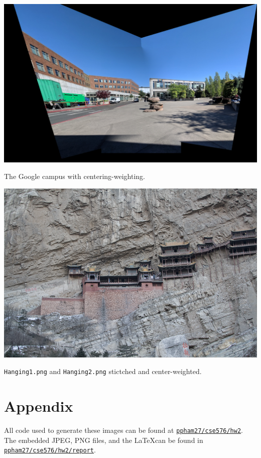 \documentclass[letterpaper]{article}
\begin{document}
\begin{center}
  \includegraphics[width=\textwidth]{google_stitched_center_weighted.png}
  
  The Google campus with centering-weighting.
\end{center}

\begin{center}
  \includegraphics[width=\textwidth]{hanging_center_weighted.png}
  
  \texttt{Hanging1.png} and \texttt{Hanging2.png} stictched and center-weighted.
\end{center}

\section*{Appendix}

All code used to generate these images can be found at
\href{https://github.com/ppham27/cse576/blob/master/hw2}{\texttt{ppham27/cse576/hw2}}. The
embedded JPEG, PNG files, and the \LaTeX can be found in
\href{https://github.com/ppham27/cse576/blob/master/hw2/report}{\texttt{ppham27/cse576/hw2/report}}.
\end{document}
